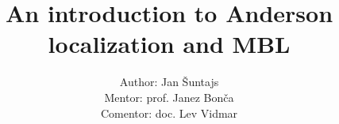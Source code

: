 \documentclass[1pt]{beamer}
\title[Anderson localization and MBL] %
{An introduction to Anderson localization and MBL}
\author[Jan Šuntajs] %
{Author: Jan Šuntajs \\ 
Mentor: prof. Janez Bonča \\
Comentor: doc. Lev Vidmar}
\begin{document}
\begin{frame}
  \titlepage
\end{frame}



\end{document}
